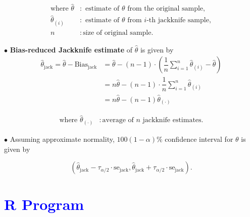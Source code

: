 \documentclass[11pt, a4paper]{article}\usepackage[]{graphicx}\usepackage[]{xcolor}
\begin{document}
\begin{align*}
\text{where } \hat{\theta} &: \text{ estimate of } \theta \text{ from the original sample}, \\[0.2em]
\widehat{\theta}_{(i)} &: \text{ estimate of } \theta \text{ from } i\text{-th jackknife sample}, \\[0.2em]
n &: \text{size of original sample}.
\end{align*}

\newpage

$\bullet$ \textbf{Bias-reduced Jackknife estimate} of $\hat{\theta}$ is given by 
\begin{align*}
\widehat{\theta}_{\text{jack}} = \widehat{\theta} - \text{Bias}_{\text{jack}} &= \widehat{\theta} -  (n - 1) \cdot \left( \dfrac{1}{n} \sum \limits_{i = 1}^{n} \widehat{\theta}_{(i)} - \hat{\theta} \right) \\[0.5em]
&= n \widehat{\theta} - (n - 1) \cdot \dfrac{1}{n} \sum \limits_{i = 1}^{n} \widehat{\theta}_{(i)} \\[1em]
&= n \widehat{\theta} - (n - 1) \widehat{\theta}_{(\cdot)}
\end{align*}

\begin{align*}
\text{where } \widehat{\theta}_{(\cdot)} &: \text{average of } n \text{ jackknife estimates.}
\end{align*}

$\bullet$ Assuming approximate normality, $100(1 - \alpha)\%$ confidence interval for $\theta$ is given by

$$\left( \widehat{\theta}_{\text{jack}} - \tau_{\alpha / 2} \cdot \text{se}_{\text{jack}}, \widehat{\theta}_{\text{jack}} + \tau_{\alpha / 2} \cdot \text{se}_{\text{jack}} \right).$$


\section*{\faArrowAltCircleRight[regular] \textcolor{blue}{R Program}}
\end{document}
